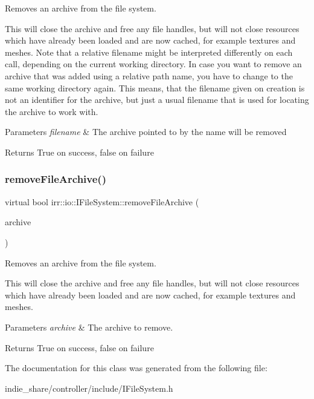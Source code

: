 Removes an archive from the file system. 

This will close the archive and free any file handles, but will not close resources which have already been loaded and are now cached, for example textures and meshes. Note that a relative filename might be interpreted differently on each call, depending on the current working directory. In case you want to remove an archive that was added using a relative path name, you have to change to the same working directory again. This means, that the filename given on creation is not an identifier for the archive, but just a usual filename that is used for locating the archive to work with. 
\begin{DoxyParams}{Parameters}
{\em filename} & The archive pointed to by the name will be removed \\
\hline
\end{DoxyParams}
\begin{DoxyReturn}{Returns}
True on success, false on failure 
\end{DoxyReturn}
\mbox{\label{classirr_1_1io_1_1IFileSystem_ab7579f5ccca7bc7c1e079f5cb38173ed}} 
\subsubsection{\texorpdfstring{remove\+File\+Archive()}{removeFileArchive()}\hspace{0.1cm}{\footnotesize\ttfamily [3/3]}}
{\footnotesize\ttfamily virtual bool irr\+::io\+::\+I\+File\+System\+::remove\+File\+Archive (\begin{DoxyParamCaption}\item[{const \hyperlink{classirr_1_1io_1_1IFileArchive}{I\+File\+Archive} $\ast$}]{archive }\end{DoxyParamCaption})\hspace{0.3cm}{\ttfamily [pure virtual]}}



Removes an archive from the file system. 

This will close the archive and free any file handles, but will not close resources which have already been loaded and are now cached, for example textures and meshes. 
\begin{DoxyParams}{Parameters}
{\em archive} & The archive to remove. \\
\hline
\end{DoxyParams}
\begin{DoxyReturn}{Returns}
True on success, false on failure 
\end{DoxyReturn}


The documentation for this class was generated from the following file\+:\begin{DoxyCompactItemize}
\item 
indie\+\_\+share/controller/include/I\+File\+System.\+h\end{DoxyCompactItemize}
